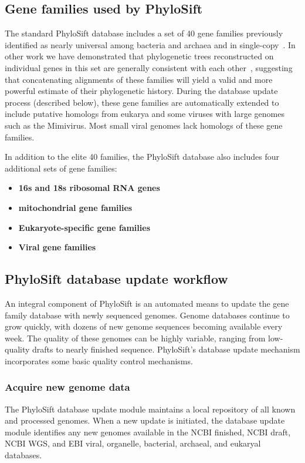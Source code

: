 \documentclass[10pt]{article}
\begin{document}
\subsection*{Gene families used by PhyloSift}

The standard PhyloSift database includes a set of 40 gene families previously identified as nearly universal among bacteria and archaea and in single-copy~\cite{DongyingMarkers}.
In other work we have demonstrated that phylogenetic trees reconstructed on individual genes in this set are generally consistent with each other~\cite{Lang2012}, suggesting that concatenating alignments of these families will yield a valid and more powerful estimate of their phylogenetic history.
During the database update process (described below), these gene families are automatically extended to include putative homologs from eukarya and some viruses with large genomes such as the Mimivirus.
Most small viral genomes lack homologs of these gene families.

In addition to the elite 40 families, the PhyloSift database also includes four additional sets of gene families:
\begin{itemize}
\item \textbf{16s and 18s ribosomal RNA genes}
\item \textbf{mitochondrial gene families}
\item \textbf{Eukaryote-specific gene families}
\item \textbf{Viral gene families}
\end{itemize}

\subsection*{PhyloSift database update workflow}
An integral component of PhyloSift is an automated means to update the gene family database with newly sequenced genomes.
Genome databases continue to grow quickly, with dozens of new genome sequences becoming available every week.
The quality of these genomes can be highly variable, ranging from low-quality drafts to nearly finished sequence.
PhyloSift's database update mechanism incorporates some basic quality control mechanisms.
\subsubsection*{Acquire new genome data}
The PhyloSift database update module maintains a local repository of all known and processed genomes.
When a new update is initiated, the database update module identifies any new genomes available in the NCBI finished, NCBI draft, NCBI WGS, and EBI viral, organelle, bacterial, archaeal, and eukaryal databases. 
\end{document}
